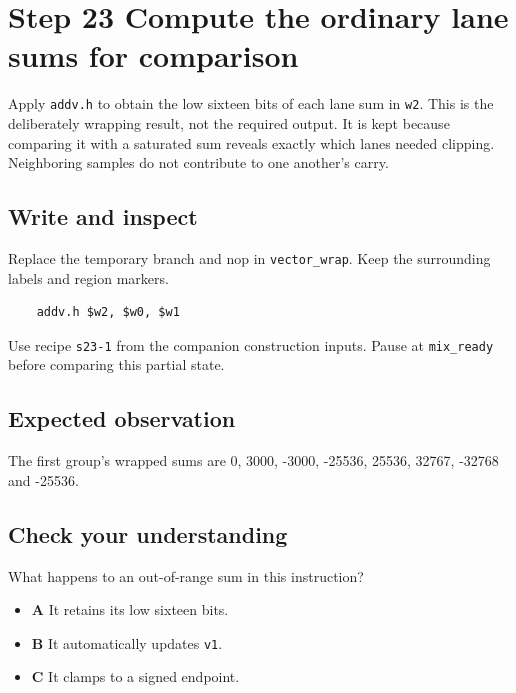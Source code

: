 \section{Step 23 Compute the ordinary lane sums for comparison}\label{pcm-s23}

Apply \texttt{addv.h} to obtain the low sixteen bits of each lane sum in \texttt{w2}. This is the deliberately wrapping result, not the required output. It is kept because comparing it with a saturated sum reveals exactly which lanes needed clipping. Neighboring samples do not contribute to one another’s carry.

\subsection{Write and inspect}
Replace the temporary branch and nop in \texttt{vector\_wrap}. Keep the surrounding labels and region markers.

\begin{verbatim}
    addv.h $w2, $w0, $w1
\end{verbatim}
Use recipe \texttt{s23-1} from the companion construction inputs. Pause at \texttt{mix\_ready} before comparing this partial state.

\subsection{Expected observation}
The first group’s wrapped sums are 0, 3000, -3000, -25536, 25536, 32767, -32768 and -25536.

\subsection{Check your understanding}
What happens to an out-of-range sum in this instruction?

\begin{itemize}
  \item \textbf{A} It retains its low sixteen bits.
  \item \textbf{B} It automatically updates \texttt{v1}.
  \item \textbf{C} It clamps to a signed endpoint.
\end{itemize}
